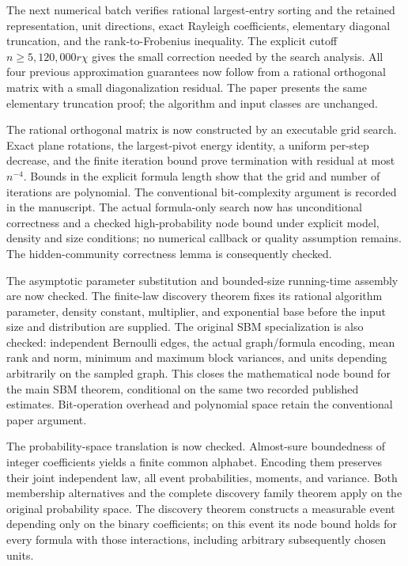 \documentclass[11pt,a4paper]{article}
\begin{document}
The next numerical batch verifies rational largest-entry sorting and the
retained representation, unit directions, exact Rayleigh coefficients,
elementary diagonal truncation, and the rank-to-Frobenius inequality.
The explicit cutoff $n\ge5{,}120{,}000r\chi$ gives the small correction
needed by the search analysis. All four previous approximation guarantees
now follow from a rational orthogonal matrix with a small diagonalization
residual. The paper presents the same elementary truncation proof; the
algorithm and input classes are unchanged.

The rational orthogonal matrix is now constructed by an executable grid
search. Exact plane rotations, the largest-pivot energy identity, a uniform
per-step decrease, and the finite iteration bound prove termination with
residual at most $n^{-4}$. Bounds in the explicit formula length show that
the grid and number of iterations are polynomial. The conventional
bit-complexity argument is recorded in the manuscript. The actual
formula-only search now has unconditional correctness and a checked
high-probability node bound under explicit model, density and size
conditions; no numerical callback or quality assumption remains.
The hidden-community correctness lemma is consequently checked.

The asymptotic parameter substitution and bounded-size running-time
assembly are now checked. The finite-law discovery theorem fixes its
rational algorithm parameter, density constant, multiplier, and exponential
base before the input size and distribution are supplied. The original
SBM specialization is also checked: independent Bernoulli edges, the actual
graph/formula encoding, mean rank and norm, minimum and maximum block
variances, and units depending arbitrarily on the sampled graph. This
closes the mathematical node bound for the main SBM theorem, conditional
on the same two recorded published estimates. Bit-operation overhead and
polynomial space retain the conventional paper argument.

The probability-space translation is now checked. Almost-sure boundedness
of integer coefficients yields a finite common alphabet. Encoding them
preserves their joint independent law, all event probabilities, moments,
and variance. Both membership alternatives and the complete discovery
family theorem apply on the original probability space. The discovery
theorem constructs a measurable event depending only on the binary
coefficients; on this event its node bound holds for every formula with
those interactions, including arbitrary subsequently chosen units.
\end{document}

